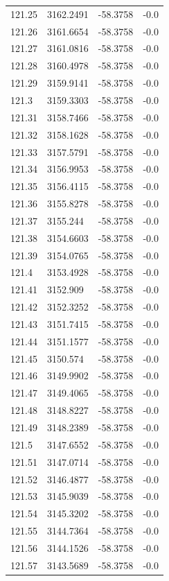 \begin{table}[H]
\begin{tabular}{llll}
121.25 & 3162.2491 & -58.3758 & -0.0 \\
121.26 & 3161.6654 & -58.3758 & -0.0 \\
121.27 & 3161.0816 & -58.3758 & -0.0 \\
121.28 & 3160.4978 & -58.3758 & -0.0 \\
121.29 & 3159.9141 & -58.3758 & -0.0 \\
121.3 & 3159.3303 & -58.3758 & -0.0 \\
121.31 & 3158.7466 & -58.3758 & -0.0 \\
121.32 & 3158.1628 & -58.3758 & -0.0 \\
121.33 & 3157.5791 & -58.3758 & -0.0 \\
121.34 & 3156.9953 & -58.3758 & -0.0 \\
121.35 & 3156.4115 & -58.3758 & -0.0 \\
121.36 & 3155.8278 & -58.3758 & -0.0 \\
121.37 & 3155.244 & -58.3758 & -0.0 \\
121.38 & 3154.6603 & -58.3758 & -0.0 \\
121.39 & 3154.0765 & -58.3758 & -0.0 \\
121.4 & 3153.4928 & -58.3758 & -0.0 \\
121.41 & 3152.909 & -58.3758 & -0.0 \\
121.42 & 3152.3252 & -58.3758 & -0.0 \\
121.43 & 3151.7415 & -58.3758 & -0.0 \\
121.44 & 3151.1577 & -58.3758 & -0.0 \\
121.45 & 3150.574 & -58.3758 & -0.0 \\
121.46 & 3149.9902 & -58.3758 & -0.0 \\
121.47 & 3149.4065 & -58.3758 & -0.0 \\
121.48 & 3148.8227 & -58.3758 & -0.0 \\
121.49 & 3148.2389 & -58.3758 & -0.0 \\
121.5 & 3147.6552 & -58.3758 & -0.0 \\
121.51 & 3147.0714 & -58.3758 & -0.0 \\
121.52 & 3146.4877 & -58.3758 & -0.0 \\
121.53 & 3145.9039 & -58.3758 & -0.0 \\
121.54 & 3145.3202 & -58.3758 & -0.0 \\
121.55 & 3144.7364 & -58.3758 & -0.0 \\
121.56 & 3144.1526 & -58.3758 & -0.0 \\
121.57 & 3143.5689 & -58.3758 & -0.0 \\

\end{tabular}
\end{table}
